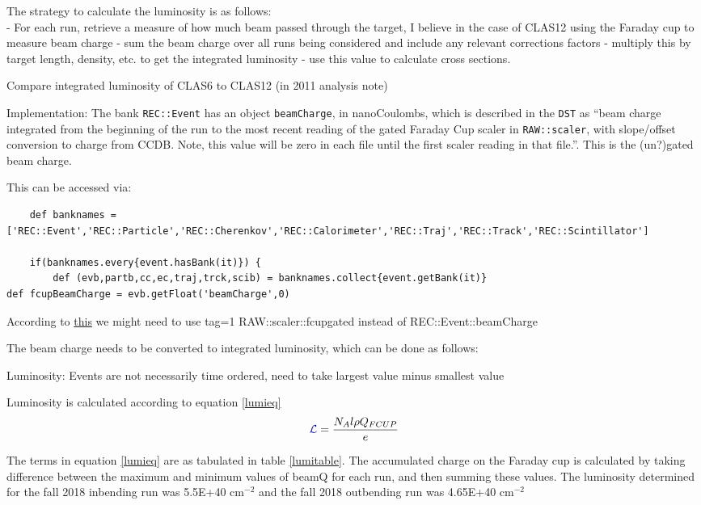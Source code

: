 
The strategy to calculate the luminosity is as follows:\\

 - For each run, retrieve a measure of how much beam passed through the target, I believe in the case of CLAS12 using the Faraday cup to measure beam charge
    - sum the beam charge over all runs being considered and include any relevant corrections factors
    - multiply this by target length, density, etc. to get the integrated luminosity
    - use this value to calculate cross sections.


Compare integrated luminosity of CLAS6 to CLAS12 (in 2011 analysis note)


Implementation:
The bank \texttt{REC::Event} has an object \texttt{beamCharge}, in nanoCoulombs, which is described in the \texttt{DST} as ``beam charge integrated from the beginning of the run to the most recent reading of the gated Faraday Cup scaler in \texttt{RAW::scaler}, with slope/offset conversion to charge from CCDB. Note, this value will be zero in each file until the first scaler reading in that file.''. This is the (un?)gated beam charge. 



This can be accessed via:

\begin{lstlisting}
	def banknames = ['REC::Event','REC::Particle','REC::Cherenkov','REC::Calorimeter','REC::Traj','REC::Track','REC::Scintillator']

	if(banknames.every{event.hasBank(it)}) {
		def (evb,partb,cc,ec,traj,trck,scib) = banknames.collect{event.getBank(it)}
def fcupBeamCharge = evb.getFloat('beamCharge',0)
\end{lstlisting}

    According to \href{https://clas12.discourse.group/t/accessing-beam-charge-information/239}{this} we might need to use tag=1 RAW::scaler::fcupgated instead of REC::Event::beamCharge
    

The beam charge needs to be converted to integrated luminosity, which can be done as follows:

Luminosity: Events are not necessarily time ordered, need to take largest value minus smallest value  


Luminosity is calculated according to equation \ref{lumieq}
 \begin{equation}\label{lumieq}
            \textcolor{blue}{ \mathcal{L}} = \frac{N_A l \rho Q_{FCUP}}{e}
\end{equation}

The terms in equation \ref{lumieq} are as tabulated in table \ref{lumitable}. The accumulated charge on the Faraday cup is calculated by taking difference between the maximum and minimum values of beamQ for each run, and then summing these values. The luminosity determined for the fall 2018 inbending run was 5.5E+40 cm$^{-2}$ and the fall 2018 outbending run was 4.65E+40 cm$^{-2}$

